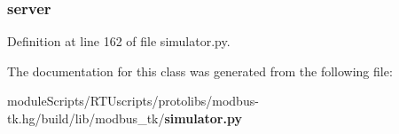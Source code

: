 \subsubsection[{server}]{\setlength{\rightskip}{0pt plus 5cm}server}\label{classmodbus__tk_1_1simulator_1_1_simulator_a4acfaa4e2d9b21de60c9a6fc63cfaa3a}


Definition at line 162 of file simulator.\+py.



The documentation for this class was generated from the following file\+:\begin{DoxyCompactItemize}
\item 
module\+Scripts/\+R\+T\+Uscripts/protolibs/modbus-\/tk.\+hg/build/lib/modbus\+\_\+tk/{\bf simulator.\+py}\end{DoxyCompactItemize}
